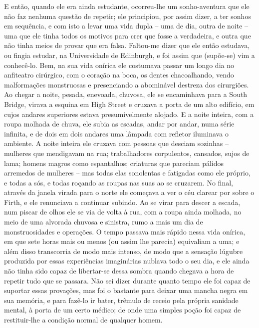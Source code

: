 E então, quando ele era ainda estudante, ocorreu-lhe um sonho-aventura
que ele não faz nenhuma questão de repetir; ele principiou, por assim
dizer, a ter sonhos em sequência, e com isto a levar uma vida dupla --
uma de dia, outra de noite -- uma que ele tinha todos os motivos para
crer que fosse a verdadeira, e outra que não tinha meios de provar que
era falsa.  Faltou-me dizer que ele então estudava, ou fingia estudar,
na Universidade de Edinburgh, e foi assim que (supõe-se) vim a
conhecê-lo.  Bem, na sua vida onírica ele costumava passar um longo dia
no anfiteatro cirúrgico, com o coração na boca, os dentes chacoalhando,
vendo malformações monstruosas e presenciando a abominável destreza dos
cirurgiões.  Ao chegar a noite, pesada, enevoada, chuvosa, ele se
encaminhava para a South Bridge, virava a esquina em High Street e
cruzava a porta de um alto edifício, em cujos andares superiores estava
presumivelmente alojado.  E a noite inteira, com a roupa molhada de
chuva, ele subia as escadas, andar por andar, numa série infinita, e de
dois em dois andares uma lâmpada com refletor iluminava o ambiente.  A
noite inteira ele cruzava com pessoas que desciam sozinhas -- mulheres
que mendigavam na rua; trabalhadores corpulentos, cansados, sujos de
lama; homens magros como espantalhos; criaturas que pareciam pálidos
arremedos de mulheres -- mas todas elas sonolentas e fatigadas como ele
próprio, e todas a sós, e todas roçando as roupas nas suas ao se
cruzarem.  No final, através da janela virada para o norte ele começava
a ver o céu clarear por sobre o Firth, e ele renunciava a continuar		%
subindo.  Ao se virar para descer a escada, num piscar de olhos ele se
via de volta à rua, com a roupa ainda molhada, no meio de uma alvorada
chuvosa e sinistra, rumo a mais um dia de monstruosidades e operações. 
O tempo passava mais rápido nessa vida onírica, em que sete horas mais
ou menos (ou assim lhe parecia) equivaliam a uma; e além disso
transcorria de modo mais intenso, de modo que a sensação lúgubre
produzida por essas experiências imaginárias nublava todo o seu dia, e
ele ainda não tinha sido capaz de libertar-se dessa sombra quando
chegava a hora de repetir tudo que se passara.  Não sei dizer durante
quanto tempo ele foi capaz de suportar essas provações, mas foi o
bastante para deixar uma mancha negra em sua memória, e para fazê-lo ir
bater, trêmulo de receio pela própria sanidade mental, à porta de um
certo médico; de onde uma simples poção foi capaz de restituir-lhe a
condição normal de qualquer homem.

